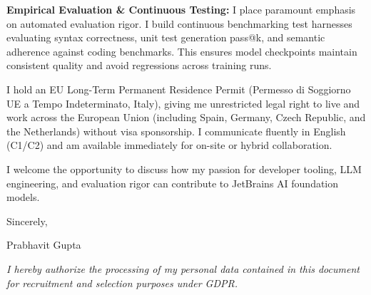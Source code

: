 \documentclass[10.5pt,a4paper]{article}
\begin{document}
\textbf{Empirical Evaluation \& Continuous Testing:} I place paramount emphasis on automated evaluation rigor. I build continuous benchmarking test harnesses evaluating syntax correctness, unit test generation pass@k, and semantic adherence against coding benchmarks. This ensures model checkpoints maintain consistent quality and avoid regressions across training runs.

I hold an EU Long-Term Permanent Residence Permit (Permesso di Soggiorno UE a Tempo Indeterminato, Italy), giving me unrestricted legal right to live and work across the European Union (including Spain, Germany, Czech Republic, and the Netherlands) without visa sponsorship. I communicate fluently in English (C1/C2) and am available immediately for on-site or hybrid collaboration.

I welcome the opportunity to discuss how my passion for developer tooling, LLM engineering, and evaluation rigor can contribute to JetBrains AI foundation models.

Sincerely,

Prabhavit Gupta

\vspace{0.6em}
{\footnotesize \textit{I hereby authorize the processing of my personal data contained in this document for recruitment and selection purposes under GDPR.}\par}
\end{document}
